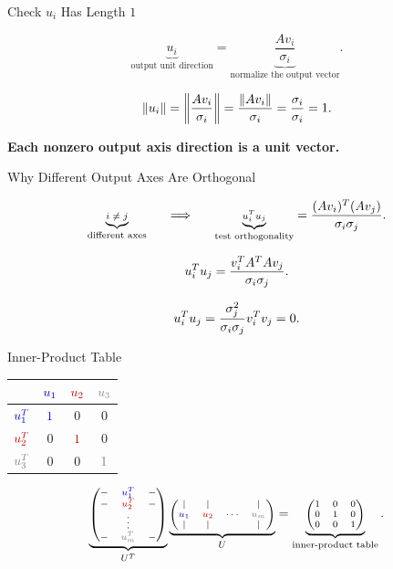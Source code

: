 \documentclass[10pt]{beamer}
\theoremstyle{definition}
\newcommand{\x}[1]{\alert{\textbf{#1}}}
\newcommand{\rd}[1]{{\color{red!70!black}#1}}
\newcommand{\bl}[1]{{\color{blue!70!black}#1}}
\newcommand{\gry}[1]{{\color{gray}#1}}
\newcommand{\Ucols}{\begin{pmatrix}|&|& &|\\ \bl{u_1}&\rd{u_2}&\cdots&\gry{u_m}\\ |&|& &|\end{pmatrix}}
\newcommand{\Urows}{\begin{pmatrix}-&\bl{u_1^T}&-\\ -&\rd{u_2^T}&-\\ &\vdots&\\ -&\gry{u_m^T}&-\end{pmatrix}}
\begin{document}
\begin{frame}{Check $u_i$ Has Length $1$}

$$
\underbrace{u_i}_{\text{output unit direction}}
=
\underbrace{\frac{Av_i}{\sigma_i}}_{\text{normalize the output vector}}.
$$

\vfill

\[
\scriptsize
\|u_i\|
=\left\|\frac{Av_i}{\sigma_i}\right\|
=\frac{\|Av_i\|}{\sigma_i}
=\frac{\sigma_i}{\sigma_i}
=1.
\]

\vfill

\begin{center}
\x{Each nonzero output axis direction is a unit vector.}
\end{center}

\end{frame}


\begin{frame}[shrink=8]{Why Different Output Axes Are Orthogonal}

\[
\scriptsize
\underbrace{i\ne j}_{\text{different axes}}
\qquad\Longrightarrow\qquad
\underbrace{u_i^Tu_j}_{\text{test orthogonality}}
=\frac{(Av_i)^T(Av_j)}{\sigma_i\sigma_j}.
\]

\vfill

\[
\scriptsize
u_i^Tu_j
=\frac{v_i^TA^TAv_j}{\sigma_i\sigma_j}.
\]

\vfill

\[
\scriptsize
u_i^Tu_j
=\frac{\sigma_j^2}{\sigma_i\sigma_j}v_i^Tv_j
=0.
\]

\end{frame}


\begin{frame}{Inner-Product Table}

\vfill

\begin{center}
\renewcommand{\arraystretch}{1.5}
\begin{tabular}{c|ccc}
 & $\bl{u_1}$ & $\rd{u_2}$ & $\gry{u_3}$\\
\hline
$\bl{u_1^T}$ & $\bl{1}$ & $0$ & $0$\\
$\rd{u_2^T}$ & $0$ & $\rd{1}$ & $0$\\
$\gry{u_3^T}$ & $0$ & $0$ & $\gry{1}$
\end{tabular}
\end{center}

\vfill

\[
\scriptsize
\underbrace{\Urows}_{U^T}
\underbrace{\Ucols}_{U}
=
\underbrace{
\begin{pmatrix}
1&0&0\\
0&1&0\\
0&0&1
\end{pmatrix}}_{\text{inner-product table}}.
\]

\end{frame}
\end{document}
